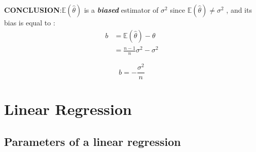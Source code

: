 \documentclass{article}
\begin{document}
\textbf{CONCLUSION}:$\mathbb{E}(\hat{\theta})$ is a \textit{\textbf{biased}} estimator of $\sigma^2$ since $\mathbb{E}(\hat{\theta}) \neq \sigma^2$ , and its bias is equal to :
\[
\begin{split}
b & = \mathbb{E}(\hat{\theta}) -  \theta \\
& = \frac{n-1}{n}\sigma^2-\sigma^2
\end{split}
\]

\begin{equation} \label{eq3}
\boxed{
b = -\frac{\sigma^2}{n}
}
\end{equation}

\section{Linear Regression}
\subsection{Parameters of a linear regression}
\end{document}
